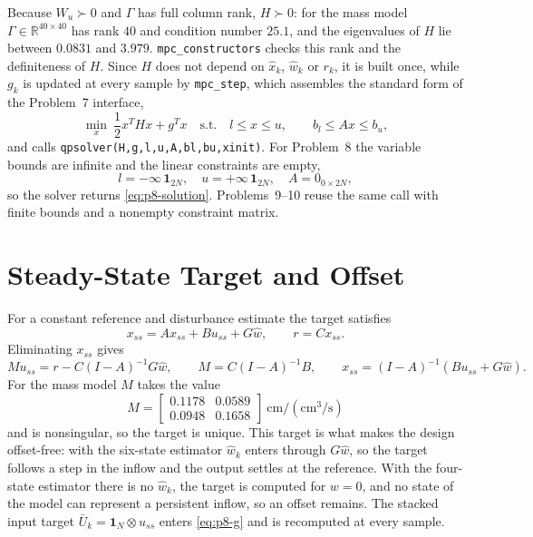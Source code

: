 Because $W_u\succ0$ and $\Gamma$ has full column rank, $H\succ0$: for the mass
model $\Gamma\in\mathbb{R}^{40\times40}$ has rank $40$ and condition number
$25.1$, and the eigenvalues of $H$ lie between $0.0831$ and $3.979$.
\texttt{mpc\_constructors} checks this rank and the definiteness of $H$. Since
$H$ does not depend on $\hat x_k$, $\hat w_k$ or $r_k$, it is built once, while
$g_k$ is updated at every sample by \texttt{mpc\_step}, which assembles the
standard form of the Problem~7 interface,
\begin{equation}
 \min_x\ \frac12x^THx+g^Tx
 \quad\text{s.t.}\quad
 l\le x\le u,\qquad b_l\le Ax\le b_u,
 \label{eq:p8-qp-standard}
\end{equation}
and calls \texttt{qpsolver(H,g,l,u,A,bl,bu,xinit)}. For Problem~8 the variable
bounds are infinite and the linear constraints are empty,
\begin{equation}
 l=-\infty\,\mathbf{1}_{2N},\quad u=+\infty\,\mathbf{1}_{2N},\quad
 A=0_{0\times2N},
 \label{eq:p8-qp-unconstrained}
\end{equation}
so the solver returns \eqref{eq:p8-solution}. Problems~9--10 reuse the same
call with finite bounds and a nonempty constraint matrix.

\section{Steady-State Target and Offset}
\label{sec:p8-target}

For a constant reference and disturbance estimate the target satisfies
\begin{equation}
 x_{ss}=Ax_{ss}+Bu_{ss}+G\hat w,
 \qquad
 r=Cx_{ss}.
 \label{eq:p8-ss-equations}
\end{equation}
Eliminating $x_{ss}$ gives
\begin{equation}
 Mu_{ss}=r-C(I-A)^{-1}G\hat w,
 \qquad
 M=C(I-A)^{-1}B,
 \qquad
 x_{ss}=(I-A)^{-1}\left(Bu_{ss}+G\hat w\right).
 \label{eq:p8-target-u}
\end{equation}
For the mass model $M$ takes the value
\begin{equation}
 M=\begin{bmatrix}0.1178&0.0589\\ 0.0948&0.1658\end{bmatrix}
 \ \mathrm{cm/(cm^3/s)}
 \label{eq:p8-M-numeric}
\end{equation}
and is nonsingular, so the target is unique. This target is what makes the design
offset-free: with the six-state estimator $\hat w_k$ enters through $G\hat w$, so
the target follows a step in the inflow and the output settles at the reference.
With the four-state estimator there is no $\hat w_k$, the target is computed for
$w=0$, and no state of the model can represent a persistent inflow, so an offset
remains. The stacked input target $\bar U_k=\mathbf{1}_N\otimes u_{ss}$ enters
\eqref{eq:p8-g} and is recomputed at every sample.

